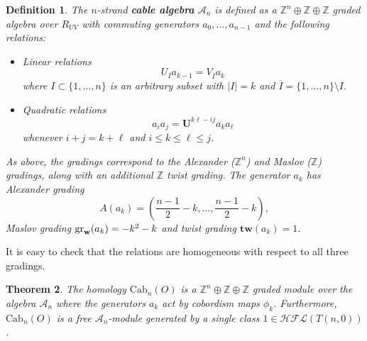 \documentclass{amsart}
\newtheorem{theorem}{Theorem}[section]
\newtheorem{definition}[theorem]{Definition}
\newcommand{\CA}{\mathcal{A}}
\newcommand{\Cab}{\mathrm{Cab}}
\newcommand{\cHFL}{\mathcal{H\!F\! L}}
\newcommand{\tw}{\mathbf{tw}}
\newcommand{\w}{\mathbf{w}}
\newcommand{\newword}[1]{\emph{\textbf{#1}}}
\def\gr{\textup{gr}}
\def\w{{\bf{w}}}
\newcommand{\Z}{\mathbb{Z}}
\newcommand{\UU}{\mathbf{U}}
\renewcommand{\AA}[1]{{\color{blue}#1}}
\newcommand{\EG}[1]{{\color{red}#1}}
\begin{document}
\begin{definition}
The $n$-strand \newword{cable algebra} $\CA_n$ is defined as a $\Z^n\oplus \Z\oplus \Z$ graded algebra  over $R_{UV}$ with commuting generators $a_0,\ldots,a_{n-1}$ and the following relations:
\begin{itemize}
\item Linear relations
\begin{equation}
\label{eq: linear}
U_Ia_{k-1}=V_{\overline{I}}a_k
\end{equation}
where $I\subset \{1,\ldots,n\}$ is an arbitrary subset with $|I|=k$ and $\overline{I}=\{1,\ldots,n\}\setminus I.$ 
\item Quadratic relations
\begin{equation}
\label{eq: quadratic}
a_ia_j=\UU^{k\ell-ij}a_{k}a_{\ell}
\end{equation} 
whenever $i+j=k+\ell$ and $i\le k\le \ell\le j$.
\end{itemize}
As above, the gradings correspond to the Alexander ($\Z^n$) and Maslov ($\Z$) gradings, along with an additional  $\Z$ \emph{twist grading}. The generator $a_k$ has Alexander grading 
$$
A(a_k)=\left(\frac{n-1}{2}-k,\ldots, \frac{n-1}{2}-k\right),
$$
Maslov grading $\gr_{\w}(a_k)=-k^2-k$ and twist grading $\tw(a_k)=1$.
\end{definition}

It is easy to check that the relations are homogeneous with respect to all three gradings.

\begin{theorem}
\label{thm: cabled algebra}
The homology $\Cab_n(O)$ is a $\Z^n\oplus \Z\oplus \Z$ graded module over the algebra $\CA_n$ where the generators $a_k$ act by cobordism maps $\phi_k$. Furthermore, $\Cab_n(O)$ is a free $\CA_n$-module generated by a single class $1\in \cHFL(T(n,0))$.
\end{theorem}
\end{document}

